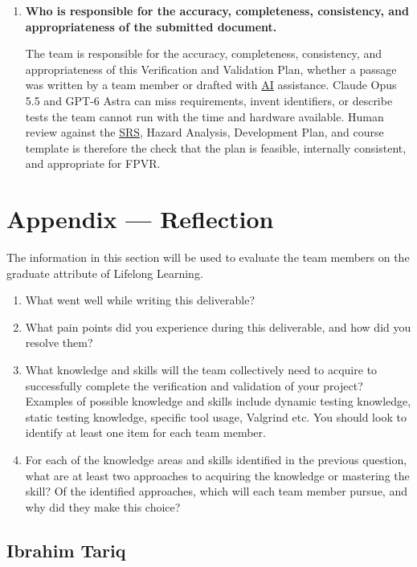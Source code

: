 \documentclass[12pt, titlepage]{article}
\begin{document}
\begin{enumerate}
    \item \textbf{Who is responsible for the accuracy, completeness,
    consistency, and appropriateness of the submitted document.}

    The team is responsible for the accuracy, completeness, consistency,
    and appropriateness of this Verification and Validation Plan, whether
    a passage was written by a team member or drafted with \hyperlink{abbr:AI}{AI} assistance.
    Claude Opus 5.5 and GPT-6 Astra can miss requirements, invent
    identifiers, or describe tests the team cannot run with the time and
    hardware available. Human review against the \hyperlink{abbr:SRS}{SRS}, Hazard Analysis,
    Development Plan, and course template is therefore the check that the
    plan is feasible, internally consistent, and appropriate for FPVR.
\end{enumerate}

\newpage{}

\section{Appendix --- Reflection}

The information in this section will be used to evaluate the team members on the
graduate attribute of Lifelong Learning.



\begin{enumerate}
  \item What went well while writing this deliverable? 
  \item What pain points did you experience during this deliverable, and how
    did you resolve them?
  \item What knowledge and skills will the team collectively need to acquire to
  successfully complete the verification and validation of your project?
  Examples of possible knowledge and skills include dynamic testing knowledge,
  static testing knowledge, specific tool usage, Valgrind etc.  You should look to
  identify at least one item for each team member.
  \item For each of the knowledge areas and skills identified in the previous
  question, what are at least two approaches to acquiring the knowledge or
  mastering the skill?  Of the identified approaches, which will each team
  member pursue, and why did they make this choice?
\end{enumerate}

\subsection*{Ibrahim Tariq}
\end{document}
